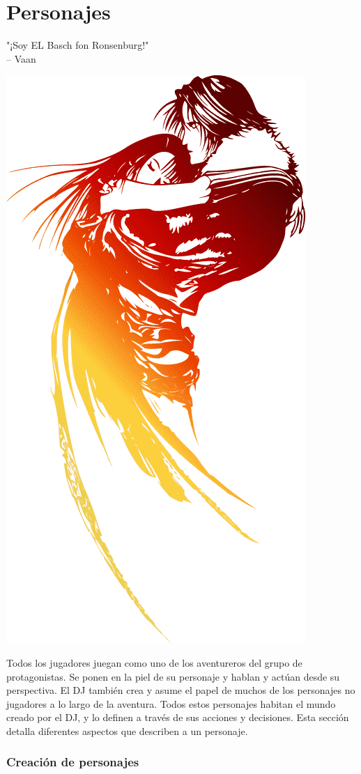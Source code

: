 \section*{\hypertarget{char}{Personajes}}
%
"¡Soy EL Basch fon Ronsenburg!" \\
\indent -- Vaan
%
\begin{center} \includegraphics[width=0.9\columnwidth]{./art/images/ff8.png} \end{center}
%
Todos los jugadores juegan como uno de los aventureros del grupo de protagonistas. Se ponen en la piel de su personaje y hablan y actúan desde su perspectiva. El DJ también crea y asume el papel de muchos de los personajes no jugadores a lo largo de la aventura. Todos estos personajes habitan el mundo creado por el DJ, y lo definen a través de sus acciones y decisiones. Esta sección detalla diferentes aspectos que describen a un personaje. \subsubsection*{Creación de personajes}
